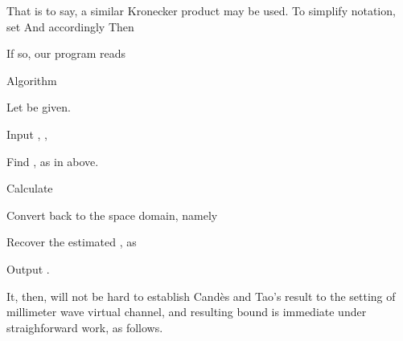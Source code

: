 That is to say, a similar Kronecker product may be used.
To simplify notation, set
And accordingly
Then

\stopsection
\startsection [title={Proposed Method}]

If so, our program reads

\Result
{Algorithm}
{
\startitemize[n]
\item Let  be given.
\item Input , ,
\item Find ,  as in above.
\item Calculate
\item Convert  back to the space domain, namely
\item Recover the estimated , as
\item Output .
\stopitemize
}

It, then, will not be hard to establish Cand\`es and Tao's result to the setting of millimeter wave virtual channel, and resulting bound is immediate under straighforward work, as follows.

\stopsection
\stopchapter
